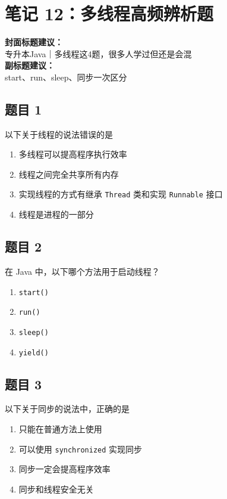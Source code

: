 \documentclass[12pt,a4paper]{ctexart}
\begin{document}
\newpage

\section{笔记 12：多线程高频辨析题}
\begin{coverbox}
\textbf{封面标题建议：}\\
专升本Java｜多线程这4题，很多人学过但还是会混\\
\textbf{副标题建议：}\\
start、run、sleep、同步一次区分
\end{coverbox}

\subsection*{题目 1}
以下关于线程的说法错误的是
\begin{enumerate}[label=\Alph*.]
    \item 多线程可以提高程序执行效率
    \item 线程之间完全共享所有内存
    \item 实现线程的方式有继承 \texttt{Thread} 类和实现 \texttt{Runnable} 接口
    \item 线程是进程的一部分
\end{enumerate}

\subsection*{题目 2}
在 Java 中，以下哪个方法用于启动线程？
\begin{enumerate}[label=\Alph*.]
    \item \texttt{start()}
    \item \texttt{run()}
    \item \texttt{sleep()}
    \item \texttt{yield()}
\end{enumerate}

\subsection*{题目 3}
以下关于同步的说法中，正确的是
\begin{enumerate}[label=\Alph*.]
    \item 只能在普通方法上使用
    \item 可以使用 \texttt{synchronized} 实现同步
    \item 同步一定会提高程序效率
    \item 同步和线程安全无关
\end{enumerate}
\end{document}
